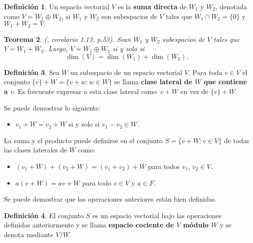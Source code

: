 \documentclass[12pt]{book}
\newtheorem{theorem}{Teorema}[section]
\theoremstyle{definition}
\newtheorem{definition}[theorem]{Definición}
\newcounter{in}
\newcounter{ini}
\begin{document}
\begin{definition}
  \label{suma-directa}
  Un espacio vectorial $V$ es la \textbf{suma directa} de $W_{1}$ y
  $W_{2}$, denotada como $V=W_{1}\oplus W_{2}$, si $W_{1}$ y $W_{2}$
  son subespacios de $V$ tales que $W_{1}\cap W_{2}=\{0\}$ y
  $W_{1}+W_{2}=V.$ 
\end{definition}


\begin{theorem}{\normalfont (\cite{friedberg1982algebra}, corolario 1.13, p.53)}. 
  Sean $W_{1}$ y $W_{2}$ subespacios de $V$ tales que
  $V=W_{1}+W_{2}$. Luego, $V=W_{1}\oplus W_{2}$ si y solo si 
  $$\dim(V)=\dim(W_{1})+\dim(W_{2}).$$
\end{theorem}

\begin{definition}
  Sea $W$ un subespacio de un espacio vectorial $V$. Para toda $v\in V$ el conjunto $\{v\}+W=\{v+w:w\in W\}$ se
  llama \textbf{clase lateral de $W$ que contiene a $v$}. Es frecuente
  expresar a esta clase lateral como~$v+W$ en vez de $\{v\}+W$. 
\end{definition}

Se puede demostrar lo siguiente:
\begin{itemize}
\item $v_{1}+W=v_{2}+W$ si y solo si $v_{1}-v_{2}\in W.$
\end{itemize}
La suma y el producto puede definirse en el conjunto $S=\{v+W:v\in
V\}$ de todas las clases laterales de $W$ como: 
\begin{itemize}
\item $(v_{1}+W)+(v_{2}+W)=(v_{1}+v_{2})+W$ para todos $v_{1}$, $v_{2}\in V$.
\item $a(v+W)=av+W$ para todo $v\in V$ y $a\in F$.
\end{itemize}
Se puede demostrar que las operaciones anteriores están bien definidas.

\begin{definition}
  El conjunto $S$ es un espacio vectorial bajo las operaciones
  definidas anteriormente y se llama \textbf{espacio cociente de $V$ módulo $W$} y se denota mediante $V/W$. 
\end{definition}
\end{document}
